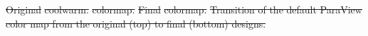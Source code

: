 \documentclass{IEEEcsmag}
\newcommand*{\colormap}[1]{\textsl{#1}\xspace}
\newcommand*{\coolwarm}{\colormap{Cool to Warm}}
\newcommand*{\blueorange}{\colormap{Blue-Orange Diverging}}
\newcommand*{\fast}{\colormap{Fast}}
\providecommand{\DIFdeltex}[1]{{\protect\color{red}\sout{#1}}}                      %
\providecommand{\DIFdelFL}[1]{\DIFdel{#1}} %
\providecommand{\DIFdel}[1]{\texorpdfstring{\DIFdeltex{#1}}{}} %
\begin{document}
{%
\DIFdelFL{Original }%
\DIFdelFL{coolwarm.}}
{%
\DIFdelFL{colormap.}}
{%
\DIFdelFL{Final }%
\DIFdelFL{colormap.}}
{%
\DIFdelFL{Transition of the default ParaView color map from the original (top) to final (bottom) designs.
  }}
\end{document}
